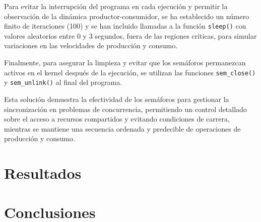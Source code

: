 \documentclass[twocolumn]{article}
\begin{document}
Para evitar la interrupción del programa en cada ejecución y permitir la observación de la dinámica productor-consumidor, se ha establecido un número finito de iteraciones (100) y se han incluido llamadas a la función \texttt{sleep()} con valores aleatorios entre 0 y 3 segundos, fuera de las regiones críticas, para simular variaciones en las velocidades de producción y consumo.

Finalmente, para asegurar la limpieza y evitar que los semáforos permanezcan activos en el kernel después de la ejecución, se utilizan las funciones \texttt{sem\_close()} y \texttt{sem\_unlink()} al final del programa.

Esta solución demuestra la efectividad de los semáforos para gestionar la sincronización en problemas de concurrencia, permitiendo un control detallado sobre el acceso a recursos compartidos y evitando condiciones de carrera, mientras se mantiene una secuencia ordenada y predecible de operaciones de producción y consumo.


\section{Resultados}
\lipsum[5-6] %

\section{Conclusiones}
\lipsum[7-8] %
\end{document}
